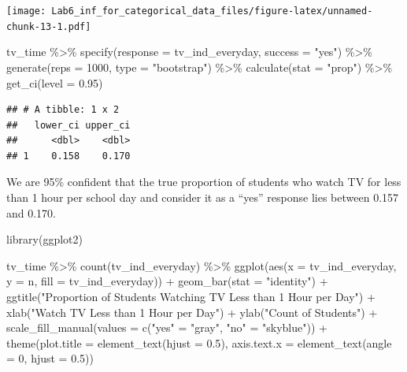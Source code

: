 \documentclass[
]{article}
\newenvironment{Shaded}{\begin{snugshade}}{\end{snugshade}}
\newcommand{\AttributeTok}[1]{\textcolor[rgb]{0.77,0.63,0.00}{#1}}
\newcommand{\DecValTok}[1]{\textcolor[rgb]{0.00,0.00,0.81}{#1}}
\newcommand{\FloatTok}[1]{\textcolor[rgb]{0.00,0.00,0.81}{#1}}
\newcommand{\FunctionTok}[1]{\textcolor[rgb]{0.00,0.00,0.00}{#1}}
\newcommand{\NormalTok}[1]{#1}
\newcommand{\OtherTok}[1]{\textcolor[rgb]{0.56,0.35,0.01}{#1}}
\newcommand{\SpecialCharTok}[1]{\textcolor[rgb]{0.00,0.00,0.00}{#1}}
\newcommand{\StringTok}[1]{\textcolor[rgb]{0.31,0.60,0.02}{#1}}
\begin{document}
\texttt{[image: Lab6\_inf\_for\_categorical\_data\_files/figure-latex/unnamed-chunk-13-1.pdf]}

\begin{Shaded}
\begin{Highlighting}[]
\NormalTok{tv\_time }\SpecialCharTok{\%\textgreater{}\%}
 \FunctionTok{specify}\NormalTok{(}\AttributeTok{response =}\NormalTok{ tv\_ind\_everyday, }\AttributeTok{success =} \StringTok{"yes"}\NormalTok{) }\SpecialCharTok{\%\textgreater{}\%}
 \FunctionTok{generate}\NormalTok{(}\AttributeTok{reps =} \DecValTok{1000}\NormalTok{, }\AttributeTok{type =} \StringTok{"bootstrap"}\NormalTok{) }\SpecialCharTok{\%\textgreater{}\%}
 \FunctionTok{calculate}\NormalTok{(}\AttributeTok{stat =} \StringTok{"prop"}\NormalTok{) }\SpecialCharTok{\%\textgreater{}\%}
 \FunctionTok{get\_ci}\NormalTok{(}\AttributeTok{level =} \FloatTok{0.95}\NormalTok{)}
\end{Highlighting}
\end{Shaded}

\begin{verbatim}
## # A tibble: 1 x 2
##   lower_ci upper_ci
##      <dbl>    <dbl>
## 1    0.158    0.170
\end{verbatim}

We are 95\% confident that the true proportion of students who watch TV
for less than 1 hour per school day and consider it as a ``yes''
response lies between 0.157 and 0.170.

\begin{Shaded}
\begin{Highlighting}[]
\FunctionTok{library}\NormalTok{(ggplot2)}

\NormalTok{tv\_time }\SpecialCharTok{\%\textgreater{}\%}
  \FunctionTok{count}\NormalTok{(tv\_ind\_everyday) }\SpecialCharTok{\%\textgreater{}\%}
  \FunctionTok{ggplot}\NormalTok{(}\FunctionTok{aes}\NormalTok{(}\AttributeTok{x =}\NormalTok{ tv\_ind\_everyday, }\AttributeTok{y =}\NormalTok{ n, }\AttributeTok{fill =}\NormalTok{ tv\_ind\_everyday)) }\SpecialCharTok{+}
  \FunctionTok{geom\_bar}\NormalTok{(}\AttributeTok{stat =} \StringTok{"identity"}\NormalTok{) }\SpecialCharTok{+}
  \FunctionTok{ggtitle}\NormalTok{(}\StringTok{"Proportion of Students Watching TV Less than 1 Hour per Day"}\NormalTok{) }\SpecialCharTok{+}
  \FunctionTok{xlab}\NormalTok{(}\StringTok{"Watch TV Less than 1 Hour per Day"}\NormalTok{) }\SpecialCharTok{+}
  \FunctionTok{ylab}\NormalTok{(}\StringTok{"Count of Students"}\NormalTok{) }\SpecialCharTok{+}
  \FunctionTok{scale\_fill\_manual}\NormalTok{(}\AttributeTok{values =} \FunctionTok{c}\NormalTok{(}\StringTok{"yes"} \OtherTok{=} \StringTok{"gray"}\NormalTok{, }\StringTok{"no"} \OtherTok{=} \StringTok{"skyblue"}\NormalTok{)) }\SpecialCharTok{+}
  \FunctionTok{theme}\NormalTok{(}\AttributeTok{plot.title =} \FunctionTok{element\_text}\NormalTok{(}\AttributeTok{hjust =} \FloatTok{0.5}\NormalTok{),}
        \AttributeTok{axis.text.x =} \FunctionTok{element\_text}\NormalTok{(}\AttributeTok{angle =} \DecValTok{0}\NormalTok{, }\AttributeTok{hjust =} \FloatTok{0.5}\NormalTok{))}
\end{Highlighting}
\end{Shaded}
\end{document}

